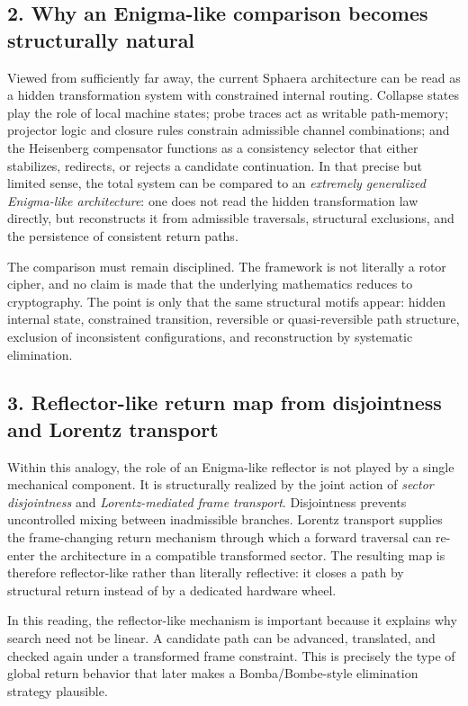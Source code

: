 \subsection*{2. Why an Enigma-like comparison becomes structurally natural}
Viewed from sufficiently far away, the current Sphaera architecture can be read as a hidden transformation system with constrained internal routing. Collapse states play the role of local machine states; probe traces act as writable path-memory; projector logic and closure rules constrain admissible channel combinations; and the Heisenberg compensator functions as a consistency selector that either stabilizes, redirects, or rejects a candidate continuation. In that precise but limited sense, the total system can be compared to an \emph{extremely generalized Enigma-like architecture}: one does not read the hidden transformation law directly, but reconstructs it from admissible traversals, structural exclusions, and the persistence of consistent return paths.

The comparison must remain disciplined. The framework is not literally a rotor cipher, and no claim is made that the underlying mathematics reduces to cryptography. The point is only that the same structural motifs appear: hidden internal state, constrained transition, reversible or quasi-reversible path structure, exclusion of inconsistent configurations, and reconstruction by systematic elimination.

\subsection*{3. Reflector-like return map from disjointness and Lorentz transport}
Within this analogy, the role of an Enigma-like reflector is not played by a single mechanical component. It is structurally realized by the joint action of \emph{sector disjointness} and \emph{Lorentz-mediated frame transport}. Disjointness prevents uncontrolled mixing between inadmissible branches. Lorentz transport supplies the frame-changing return mechanism through which a forward traversal can re-enter the architecture in a compatible transformed sector. The resulting map is therefore reflector-like rather than literally reflective: it closes a path by structural return instead of by a dedicated hardware wheel.

In this reading, the reflector-like mechanism is important because it explains why search need not be linear. A candidate path can be advanced, translated, and checked again under a transformed frame constraint. This is precisely the type of global return behavior that later makes a Bomba/Bombe-style elimination strategy plausible.

